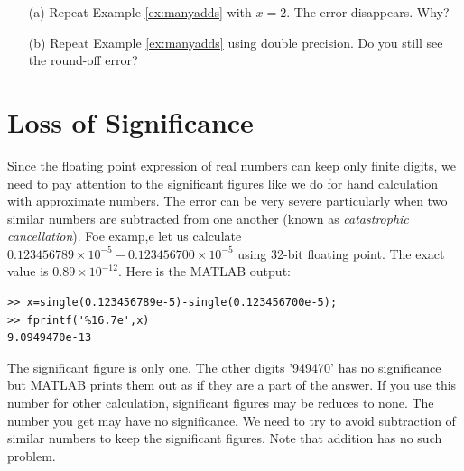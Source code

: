 \bigskip
\noindent
\exercise
\begin{itemize}
\item[(a)]  Repeat Example \ref{ex:manyadds} with $x=2$.  The error disappears. Why?
\item[(b)]  Repeat Example \ref{ex:manyadds} using double precision.  Do you still see the round-off error?
\end{itemize}

\noindent
\section{Loss of Significance}\label{sec:significance}

Since the floating point expression of real numbers can keep only finite digits, we need to pay attention to the significant figures like we do for hand calculation with approximate numbers.  The error can be very severe particularly when two similar numbers are subtracted from one another (known as \emph{catastrophic cancellation}).  Foe examp,e let us calculate $0.123456789 \times 10^{-5} - 0.123456700 \times 10^{-5}$ using 32-bit floating point.  The exact value is $0.89 \times 10^{-12}$.   Here is the MATLAB output:

\small
\begin{mybox}
	\begin{verbatim}
>> x=single(0.123456789e-5)-single(0.123456700e-5);
>> fprintf('%16.7e',x)
9.0949470e-13
   \end{verbatim}
\end{mybox}
\normalsize
The significant figure is only one. The other digits '949470' has no significance but MATLAB prints them out as if they are a part of the answer.  If you use this number for other calculation, significant figures may be reduces to none.   The number you get may have no significance.  We need to try to avoid subtraction of similar numbers to keep the significant figures.  Note that addition has no such problem.

